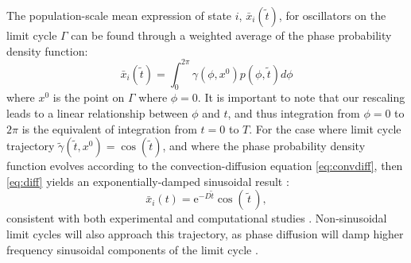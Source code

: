 The population-scale mean expression of state $i$, $\bar{x}_i(\tilde{t})$, for oscillators on the limit cycle $\Gamma$ can be found through a weighted average of the phase probability density function:
\begin{equation}\label{eq:diff}
    \bar{x}_i(\tilde{t}) = \int_0^{2\pi} \gamma(\phi,x^0) p(\phi,\tilde{t}) d\phi
\end{equation}
where $x^0$ is the point on $\Gamma$ where $\phi=0$.
It is important to note that our rescaling leads to a linear relationship between $\phi$ and $t$, and thus integration from $\phi=0$ to $2\pi$ is the equivalent of integration from $t=0$ to $T$.
For the case where limit cycle trajectory $\tilde{\gamma}(\tilde{t}, x^0) = \cos(\tilde{t})$, and where the phase probability density function evolves according to the convection-diffusion equation \eqref{eq:convdiff},  then \eqref{eq:diff} yields an exponentially-damped sinusoidal result \cite{StJohn2014b}:
\begin{equation}
    \bar{x}_i(t) = \mathrm{e}^{-D\tilde{t}}\cos(\, \tilde{t} \,),
\end{equation}
consistent with both experimental and computational studies \cite{Welsh2004, Rougemont2007, StJohn2015}.
Non-sinusoidal limit cycles will also approach this trajectory, as phase diffusion will damp higher frequency sinusoidal components of the limit cycle \cite{StJohn2014b}.

